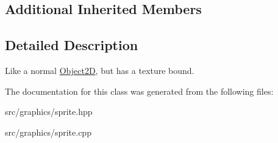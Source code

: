 \subsection*{Additional Inherited Members}


\subsection{Detailed Description}
Like a normal \mbox{\hyperlink{class_object2_d}{Object2D}}, but has a texture bound. 

The documentation for this class was generated from the following files\+:\begin{DoxyCompactItemize}
\item 
src/graphics/sprite.\+hpp\item 
src/graphics/sprite.\+cpp\end{DoxyCompactItemize}
